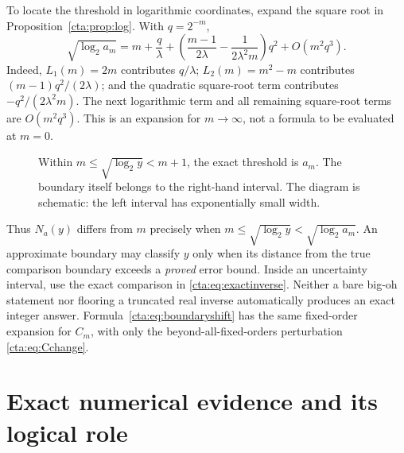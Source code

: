 \documentclass[11pt]{article}
\theoremstyle{definition}
\theoremstyle{remark}
\newcommand{\la}{\lambda}
\begin{document}
To locate the threshold in logarithmic coordinates, expand the square
root in Proposition~\ref{cta:prop:log}. With $q=2^{-m}$,
\begin{equation}\label{cta:eq:boundaryshift}
 \sqrt{\log_2a_m}
 =m+\frac q\la+
 \left(\frac{m-1}{2\la}-\frac{1}{2\la^2m}\right)q^2
 +O(m^2q^3).
\end{equation}
Indeed, $L_1(m)=2m$ contributes $q/\la$; $L_2(m)=m^2-m$
contributes $(m-1)q^2/(2\la)$; and the quadratic square-root term
contributes $-q^2/(2\la^2m)$. The next logarithmic term and all remaining
square-root terms are $O(m^2q^3)$. This is an expansion for $m\to\infty$,
not a formula to be evaluated at $m=0$.

\begin{figure}[htbp]
\centering
{}
\caption{Within $m\leq\sqrt{\log_2y}<m+1$, the exact threshold is $a_m$.
The boundary itself belongs to the right-hand interval. The diagram is
schematic: the left interval has exponentially small width.}
\label{cta:fig:threshold}
\end{figure}

Thus $N_a(y)$ differs from $m$ precisely when
$m\leq\sqrt{\log_2y}<\sqrt{\log_2a_m}$. An approximate boundary may classify
$y$ only when its distance from the true comparison boundary exceeds a
\emph{proved} error bound. Inside an uncertainty interval, use the exact
comparison in \eqref{cta:eq:exactinverse}. Neither a bare big-oh statement nor
flooring a truncated real inverse automatically produces an exact integer
answer. Formula~\eqref{cta:eq:boundaryshift} has the same fixed-order expansion
for $C_m$, with only the beyond-all-fixed-orders perturbation
\eqref{cta:eq:Cchange}.

\section{Exact numerical evidence and its logical role}\label{cta:sec:evidence}
\end{document}
